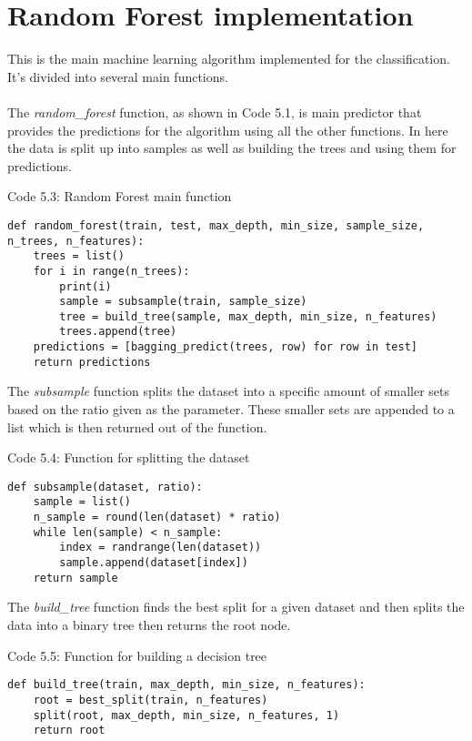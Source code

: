 \section{Random Forest implementation}
This is the main machine learning algorithm implemented for the classification. It's divided into several main functions. 
\\
\\
The \textit{random\_forest} function, as shown in Code 5.1, is main predictor that provides the predictions for the algorithm using all the other functions. In here the data is split up into samples as well as building the trees and using them for predictions. 
\begin{center} 
Code 5.3: Random Forest main function
\end{center}
\begin{lstlisting}
def random_forest(train, test, max_depth, min_size, sample_size, n_trees, n_features):
    trees = list()
    for i in range(n_trees):
        print(i)
        sample = subsample(train, sample_size)
        tree = build_tree(sample, max_depth, min_size, n_features)
        trees.append(tree)
    predictions = [bagging_predict(trees, row) for row in test]
    return predictions
\end{lstlisting}

The \textit{subsample} function splits the dataset into a specific amount of smaller sets based on the ratio given as the parameter. These smaller sets are appended to a list which is then returned out of the function. 
\begin{center} 
Code 5.4: Function for splitting the dataset
\end{center}
\begin{lstlisting}
def subsample(dataset, ratio):
    sample = list()
    n_sample = round(len(dataset) * ratio)
    while len(sample) < n_sample:
        index = randrange(len(dataset))
        sample.append(dataset[index])
    return sample
\end{lstlisting}

The \textit{build\_tree} function finds the best split for a given dataset and then splits the data into a binary tree then returns the root node.
\begin{center} 
Code 5.5: Function for building a decision tree
\end{center}
\begin{lstlisting}
def build_tree(train, max_depth, min_size, n_features):
    root = best_split(train, n_features)
    split(root, max_depth, min_size, n_features, 1)
    return root
\end{lstlisting}

